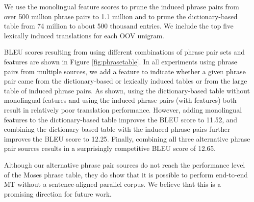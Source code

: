 \documentclass[11pt]{article}
\newcommand{\mnote}[1]{\marginpar{%
  \vskip-\baselineskip
  \raggedright\footnotesize
  \itshape\hrule\smallskip\tiny{#1}\par\smallskip\hrule}}
\newcommand{\mtodo}[1]{\mnote{\textcolor{red}{#1}}}
\begin{document}
We use the monolingual feature scores to prune the induced phrase pairs from over 500 million phrase pairs to 1.1 million and to prune the dictionary-based table from 74 million to about 500 thousand entries. We include the top five lexically induced translations for each OOV unigram.

BLEU scores resulting from using different combinations of phrase pair sets and features are shown in Figure \ref{fig:phrasetable}. In all experiments using phrase pairs from multiple sources, we add a feature to indicate whether a given phrase pair came from the dictionary-based or lexically induced tables or from the large table of induced phrase pairs. As shown, using the dictionary-based table without monolingual features and using the induced phrase pairs (with features) both result in relatively poor translation performance. However, adding monolingual features to the dictionary-based table improves the BLEU score to 
11.52, and combining the dictionary-based table with the induced phrase pairs further improves the BLEU score to 12.25. Finally, combining all three alternative phrase pair sources results in a surprisingly competitive BLEU score of 12.65\mtodo{get final score with tuning, and with other lower frequency terms}. 

Although our alternative phrase pair sources do not reach the performance level of the Moses phrase table, they do show that it is possible to perform end-to-end MT without a sentence-aligned parallel corpus. We believe that this is a promising direction for future work.
\end{document}
